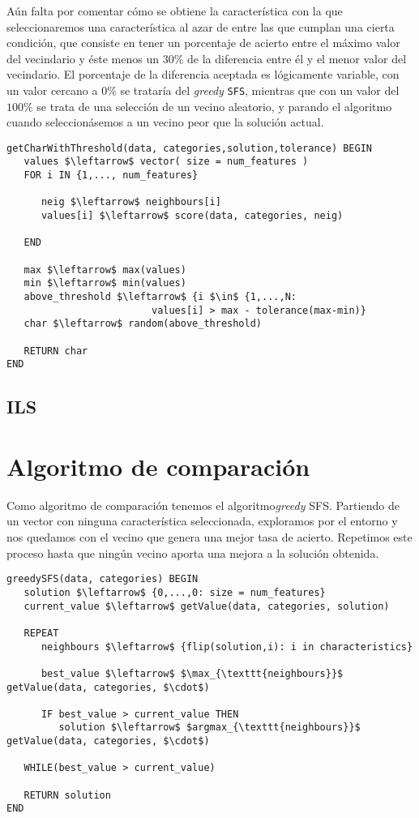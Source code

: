 \documentclass[11pt,leqno]{article}
\begin{document}
	Aún falta por comentar cómo se obtiene la característica con la que seleccionaremos una característica al azar de entre las que cumplan una cierta condición, que consiste en tener un porcentaje de acierto entre el máximo valor del vecindario y éste menos un $30\%$ de la diferencia entre él y el menor valor del vecindario. El porcentaje de la diferencia aceptada es lógicamente variable, con un valor cercano a $0\%$ se trataría del \textit{greedy} \texttt{SFS}, mientras que con un valor del $100\%$ se trata de una selección de un vecino aleatorio, y parando el algoritmo cuando seleccionásemos a un vecino peor que la solución actual.
	
	\begin{lstlisting}[mathescape=true]
getCharWithThreshold(data, categories,solution,tolerance) BEGIN
   values $\leftarrow$ vector( size = num_features )
   FOR i IN {1,..., num_features}
      
      neig $\leftarrow$ neighbours[i]
      values[i] $\leftarrow$ score(data, categories, neig)
   
   END
   
   max $\leftarrow$ max(values)
   min $\leftarrow$ min(values)   
   above_threshold $\leftarrow$ {i $\in$ {1,...,N: 
                         values[i] > max - tolerance(max-min)}
   char $\leftarrow$ random(above_threshold)
   
   RETURN char 
END
	\end{lstlisting}
	
	
	
\subsection{ILS}

	

\section{Algoritmo de comparación}

Como algoritmo de comparación tenemos el algoritmo\textit{greedy} SFS. Partiendo de un vector con ninguna característica seleccionada, exploramos por el entorno y nos quedamos con el vecino que genera una mejor tasa de acierto. Repetimos este proceso hasta que ningún vecino aporta una mejora a la solución obtenida.

	\begin{lstlisting}[mathescape=true]
greedySFS(data, categories) BEGIN
   solution $\leftarrow$ {0,...,0: size = num_features}
   current_value $\leftarrow$ getValue(data, categories, solution)
   
   REPEAT
      neighbours $\leftarrow$ {flip(solution,i): i in characteristics}
   
      best_value $\leftarrow$ $\max_{\texttt{neighbours}}$ getValue(data, categories, $\cdot$)
      
      IF best_value > current_value THEN
         solution $\leftarrow$ $argmax_{\texttt{neighbours}}$ getValue(data, categories, $\cdot$)
   
   WHILE(best_value > current_value)
   
   RETURN solution
END
	\end{lstlisting}
\end{document}
